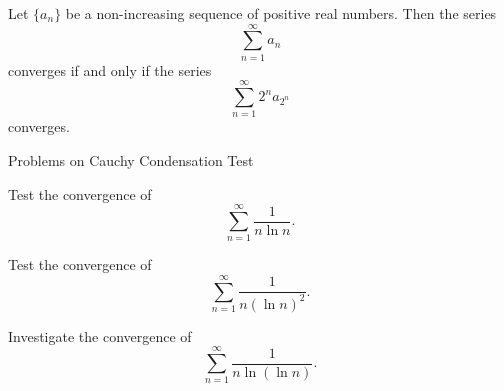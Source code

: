 \documentclass[12pt, a4paper]{article}
\begin{document}
\vspace{10pt}

\begin{theorem}
Let $\{a_n\}$ be a non-increasing sequence of positive real numbers.  
Then the series
\[
\sum_{n=1}^{\infty} a_n
\]
converges if and only if the series
\[
\sum_{n=1}^{\infty} 2^{n} a_{2^{n}}
\]
converges.
\end{theorem}

\clearpage

\begin{heading}
    Problems on Cauchy Condensation Test
\end{heading}

\begin{problem}
Test the convergence of 
\[
\sum_{n=1}^{\infty} \frac{1}{n \ln n}.
\]
\end{problem}

\clearpage

\begin{problem}
Test the convergence of 
\[
\sum_{n=1}^{\infty} \frac{1}{n(\ln n)^2}.
\]
\end{problem}


\clearpage

\begin{problem}
Investigate the convergence of 
\[
\sum_{n=1}^{\infty} \frac{1}{n \ln(\ln n)}.
\]
\end{problem}


\clearpage



\EndPage
\end{document}
